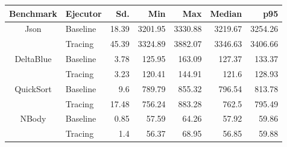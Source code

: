 \begin{center}
\begin{tabular}{ c | l r r r r r}
\toprule
\textbf{Benchmark} & \textbf{Ejecutor} & \textbf{Sd.} & \textbf{Min} & \textbf{Max} & \textbf{Median} & \textbf{p95}\\
\toprule

\multirow{2}{*}{ Json } & Baseline & 18.39 & 3201.95 & 3330.88 & 3219.67 & 3254.26 \\
& Tracing & 45.39 & 3324.89 & 3882.07 & 3346.63 & 3406.66 \\
\midrule

\multirow{2}{*}{ DeltaBlue } & Baseline & 3.78 & 125.95 & 163.09 & 127.37 & 133.37 \\
& Tracing & 3.23 & 120.41 & 144.91 & 121.6 & 128.93 \\
\midrule

\multirow{2}{*}{ QuickSort } & Baseline & 9.6 & 789.79 & 855.32 & 796.54 & 813.78 \\
& Tracing & 17.48 & 756.24 & 883.28 & 762.5 & 795.49 \\
\midrule

\multirow{2}{*}{ NBody } & Baseline & 0.85 & 57.59 & 64.26 & 57.92 & 59.86 \\
& Tracing & 1.4 & 56.37 & 68.95 & 56.85 & 59.88 \\
\midrule

\end{tabular}
\end{center}